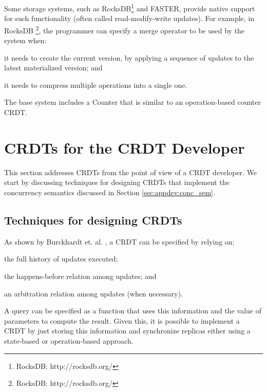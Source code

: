 \documentclass[12pt]{article}
\newcommand{\note}[1]{}
\begin{document}
Some storage systems, such as RocksDB\footnote{RocksDB: http://rocksdb.org/} and
FASTER, provide native support for such functionality (often called  
read-modify-write updates). For example, in RocksDB \footnote{RocksDB: http://rocksdb.org/},
the programmer can specify a merge operator to be used by the system when:
\begin{inparaenum}[(i)]
\item it needs to create the current version, by applying a sequence of updates
to the latest materialized version; and
\item it needs to compress multiple operations into a single one.
\end{inparaenum}
The base system includes a Counter that is similar to an operation-based counter 
CRDT.
\note{We have implemented a database that stores other CRDTs on top of RocksDB
by exploring this functionality: \url{https://github.com/preguica/RocksDBCRDTDB}.}




\section{CRDTs for the CRDT Developer}\label{sec:crdtdev}

This section addresses CRDTs from the point of view of a CRDT developer.
We start by discussing techniques for designing CRDTs that implement
the concurrency semantics discussed in Section \ref{sec:appdev:conc_sem}.

\subsection{Techniques for designing CRDTs}

As shown by Burckhardt et. al. \cite{Burckhardt14Replicated}, a CRDT can be
specified by relying on:
\begin{inparaenum}[(i)]
\item the full history of updates executed; 
\item the happens-before relation among updates; and 
\item an arbitration relation among updates (when necessary).
\end{inparaenum}
A query can be specified as a function that uses this information and
the value of parameters to compute the result.
Given this, it is possible to implement a CRDT by just storing 
this information and synchronize replicas either using a state-based or 
operation-based approach. 
\end{document}
